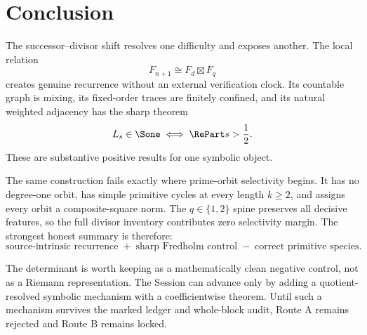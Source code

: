 \section{Conclusion}
\label{sec:conclusion}

The successor--divisor shift resolves one difficulty and exposes another.
The local relation
\[
 F_{n+1}\cong F_d\boxtimes F_q
\]
creates genuine recurrence without an external verification clock.  Its
countable graph is mixing, its fixed-order traces are finitely confined, and
its natural weighted adjacency has the sharp theorem
\[
 L_s\in\Sone\iff\RePart s>\frac12.
\]
These are substantive positive results for one symbolic object.

The same construction fails exactly where prime-orbit selectivity begins.
It has no degree-one orbit, has simple primitive cycles at every length
\(k\ge2\), and assigns every orbit a composite-square norm.  The
\(q\in\{1,2\}\) spine preserves all decisive features, so the full divisor
inventory contributes zero selectivity margin.  The strongest honest summary
is therefore:
\[
\text{source-intrinsic recurrence}
\;+\;
\text{sharp Fredholm control}
\;-\;
\text{correct primitive species}.
\]

The determinant is worth keeping as a mathematically clean negative control,
not as a Riemann representation.  The Session can advance only by adding a
quotient-resolved symbolic mechanism with a coefficientwise theorem.  Until
such a mechanism survives the marked ledger and whole-block audit, Route A
remains rejected and Route B remains locked.

